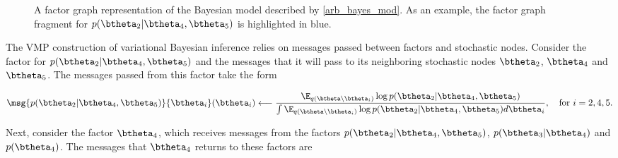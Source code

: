 \documentclass[12pt]{article}
\theoremstyle{plain}
\theoremstyle{definition}
\theoremstyle{remark}
\begin{document}
\begin{figure}
\caption{
	A factor graph representation of the Bayesian model described by \eqref{arb_bayes_mod}. As an example,
	the factor graph fragment for $p (\btheta_2 | \btheta_4, \btheta_5)$ is highlighted in blue.
}
\label{fig:arb_bayes_mod_fg}
\end{figure}

The VMP construction of variational Bayesian inference relies on messages passed between factors and stochastic
nodes. Consider the factor for $p (\btheta_2 | \btheta_4, \btheta_5)$ and the messages that it will pass to its
neighboring stochastic nodes $\btheta_2$, $\btheta_4$ and $\btheta_5$. The messages passed from this
factor take the form

\[
	\msg{p (\btheta_2 | \btheta_4, \btheta_5)}{\btheta_i} (\btheta_i)
		\longleftarrow
			\frac{
				\E_{q(\btheta \setminus \btheta_i)} \log p (\btheta_2 | \btheta_4, \btheta_5)
			} {
				\int \E_{q(\btheta \setminus \btheta_i)} \log p (\btheta_2 | \btheta_4, \btheta_5) d\btheta_i
			},
	\quad \text{for $i = 2, 4, 5$.}
\]

\noindent Next, consider the factor $\btheta_4$, which receives messages from the factors
$p (\btheta_2 | \btheta_4, \btheta_5)$, $p (\btheta_3 | \btheta_4)$ and $p (\btheta_4)$. The messages that $\btheta_4$
returns to these factors are
\end{document}

